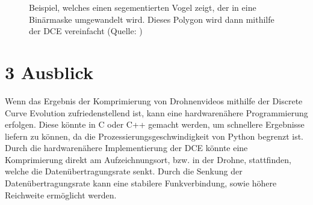 \documentclass[a4paper,11pt,pdftex, parskip]{scrreprt}
\begin{document}
{\begin{figure}[ht]
    \caption[Beispiel aus \citep{Dorr2017}]{Beispiel, welches einen segementierten Vogel zeigt, der in eine Binärmaske umgewandelt wird. Dieses Polygon wird dann mithilfe der DCE vereinfacht (Quelle: \citep{Dorr2017})}
    \label{Bsp_Dorr}
\end{figure}
}


    
    






\section*{3 Ausblick}
Wenn das Ergebnis der Komprimierung von Drohnenvideos mithilfe der Discrete Curve Evolution zufriedenstellend ist, kann eine hardwarenähere Programmierung erfolgen. Diese könnte in C oder C++ gemacht werden, um schnellere Ergebnisse liefern zu können, da die Prozessierungsgeschwindigkeit von Python begrenzt ist.\newline
Durch die hardwarenähere Implementierung der DCE könnte eine Komprimierung direkt am Aufzeichnungsort, bzw. in der Drohne, stattfinden, welche die Datenübertragungsrate senkt. Durch die Senkung der Datenübertragungsrate kann eine stabilere Funkverbindung, sowie höhere Reichweite ermöglicht werden.



\appendix




\setcounter{page}{1}
\listoffigures
\end{document}
